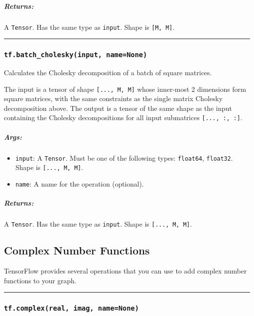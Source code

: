 \subparagraph{Returns: }\label{returns-31}

A \texttt{Tensor}. Has the same type as \texttt{input}. Shape is
\texttt{{[}M,\ M{]}}.

\begin{center}\rule{0.5\linewidth}{\linethickness}\end{center}

\subsubsection{\texorpdfstring{\texttt{tf.batch\_cholesky(input,\ name=None)}
}{tf.batch\_cholesky(input, name=None) }}\label{tf.batchux5fcholeskyinput-namenone}

Calculates the Cholesky decomposition of a batch of square matrices.

The input is a tensor of shape \texttt{{[}...,\ M,\ M{]}} whose
inner-most 2 dimensions form square matrices, with the same constraints
as the single matrix Cholesky decomposition above. The output is a
tensor of the same shape as the input containing the Cholesky
decompositions for all input submatrices \texttt{{[}...,\ :,\ :{]}}.

\subparagraph{Args: }\label{args-32}

\begin{itemize}
\tightlist
\item
  \texttt{input}: A \texttt{Tensor}. Must be one of the following types:
  \texttt{float64}, \texttt{float32}. Shape is
  \texttt{{[}...,\ M,\ M{]}}.
\item
  \texttt{name}: A name for the operation (optional).
\end{itemize}

\subparagraph{Returns: }\label{returns-32}

A \texttt{Tensor}. Has the same type as \texttt{input}. Shape is
\texttt{{[}...,\ M,\ M{]}}.

\subsection{Complex Number Functions }\label{complex-number-functions}

TensorFlow provides several operations that you can use to add complex
number functions to your graph.

\begin{center}\rule{0.5\linewidth}{\linethickness}\end{center}

\subsubsection{\texorpdfstring{\texttt{tf.complex(real,\ imag,\ name=None)}
}{tf.complex(real, imag, name=None) }}\label{tf.complexreal-imag-namenone}

